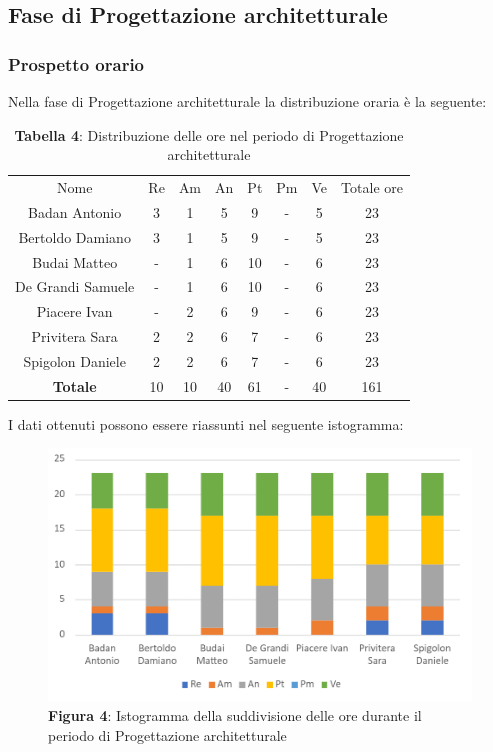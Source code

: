 \subsection{Fase di Progettazione architetturale}
\subsubsection{Prospetto orario}
Nella fase di Progettazione architetturale la distribuzione oraria è la seguente:

\begin{table}[H]
	\centering
	\renewcommand{\arraystretch}{1.5}
	\begin{tabular}{|c|c|c|c|c|c|c|c|}
		\hline
		\rowcolor{lighter-grayer}
		Nome & Re & Am & An & Pt & Pm & Ve & Totale ore\\
Badan Antonio     & 3  & 1  & 5  & 9  & - & 5  & 23  \\ \hline
Bertoldo Damiano  & 3  & 1  & 5  & 9  & - & 5  & 23  \\ \hline
Budai Matteo      & - & 1  & 6  & 10 & - & 6  & 23  \\ \hline
De Grandi Samuele & - & 1  & 6  & 10 & - & 6  & 23  \\ \hline
Piacere Ivan      & - & 2  & 6  & 9  & - & 6  & 23  \\ \hline
Privitera Sara    & 2  & 2  & 6  & 7  & - & 6  & 23  \\ \hline
Spigolon Daniele  & 2  & 2  & 6  & 7  & - & 6  & 23  \\ \hline
\textbf{Totale}   & 10 & 10 & 40 & 61 & - & 40 & 161 \\ \hline
	\end{tabular}
	\caption*{\textbf{Tabella 4}: Distribuzione delle ore nel periodo di Progettazione architetturale\\}
\end{table}	
I dati ottenuti possono essere riassunti nel seguente istogramma:

\begin{figure}[H]
	\centering
	\includegraphics[width=0.7\linewidth]{res/images/IstogrammaFase2.png}
	\caption*{\textbf{Figura 4}: Istogramma della suddivisione delle ore durante il periodo di Progettazione architetturale}
	\label{fig:Figura10}
\end{figure}


